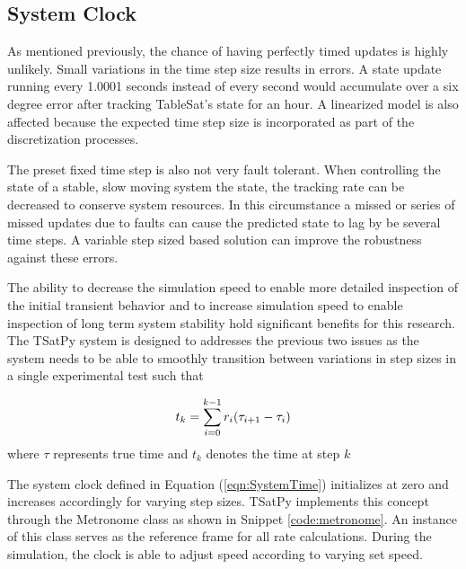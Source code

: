 \subsection{System Clock}
\label{subsec:SystemClock}

As mentioned previously, the chance of having perfectly timed updates is highly unlikely.  Small variations in the time step size results in errors.  A state update running every 1.0001 seconds instead of every second would accumulate over a six degree error after tracking TableSat's state for an hour.  A linearized model is also affected because the expected time step size is incorporated as part of the discretization processes.

The preset fixed time step is also not very fault tolerant.  When controlling the state of a stable, slow moving system the state, the tracking rate can be decreased to conserve system resources.  In this circumstance a missed or series of missed updates due to faults can cause the predicted state to lag by be several time steps.  A variable step sized based solution can improve the robustness against these errors.

The ability to decrease the simulation speed to enable more detailed inspection of the initial transient behavior and to increase simulation speed to enable inspection of long term system stability hold significant benefits for this research.  The TSatPy system is designed to addresses the previous two issues as the system needs to be able to smoothly transition between variations in step sizes in a single experimental test such that

\begin{equation}
  t_k = \sum\limits_{i=0}^{k-1} r_i (\tau_{i+1} - \tau_i)\\
  \label{eqn:SystemTime}
\end{equation}
where $\tau$ represents true time and $t_k$ denotes the time at step $k$

The system clock defined in Equation (\ref{eqn:SystemTime}) initializes at zero and increases accordingly for varying step sizes.  TSatPy implements this concept through the Metronome class as shown in Snippet \ref{code:metronome}.  An instance of this class serves as the reference frame for all rate calculations.  During the simulation, the clock is able to adjust speed according to varying set speed.

